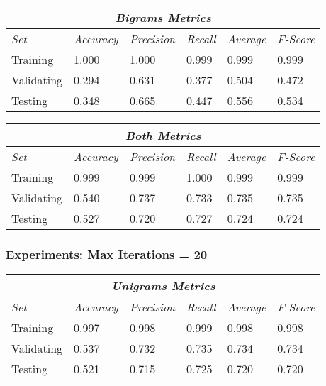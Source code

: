 \documentclass[11pt]{article}
\begin{document}
\hfill \break

\begin{tabular}{ |p{2cm}||p{2cm}|p{2cm}|p{2cm}|p{2cm}|p{2cm}|  }
 \hline
 \multicolumn{6}{|c|}{\textbf{\textit{Bigrams Metrics}}} \\
 \hline
 \textit{Set} & \textit{Accuracy} & \textit{Precision} & \textit{Recall} & \textit{Average} & \textit{F-Score} \\
 \hline
 Training   & 1.000 & 1.000 & 0.999 & 0.999 & 0.999 \\
 Validating & 0.294 & 0.631 & 0.377 & 0.504 & 0.472 \\
 Testing    & 0.348 & 0.665 & 0.447 & 0.556 & 0.534 \\
 \hline
\end{tabular}

\hfill \break

\begin{tabular}{ |p{2cm}||p{2cm}|p{2cm}|p{2cm}|p{2cm}|p{2cm}|  }
 \hline
 \multicolumn{6}{|c|}{\textbf{\textit{Both Metrics}}} \\
 \hline
 \textit{Set} & \textit{Accuracy} & \textit{Precision} & \textit{Recall} & \textit{Average} & \textit{F-Score} \\
 \hline
 Training   & 0.999 & 0.999 & 1.000 & 0.999 & 0.999 \\
 Validating & 0.540 & 0.737 & 0.733 & 0.735 & 0.735 \\
 Testing    & 0.527 & 0.720 & 0.727 & 0.724 & 0.724 \\
 \hline
\end{tabular}


\subsubsection{Experiments: Max Iterations = 20}

\begin{tabular}{ |p{2cm}||p{2cm}|p{2cm}|p{2cm}|p{2cm}|p{2cm}|  }
 \hline
 \multicolumn{6}{|c|}{\textbf{\textit{Unigrams Metrics}}} \\
 \hline
 \textit{Set} & \textit{Accuracy} & \textit{Precision} & \textit{Recall} & \textit{Average} & \textit{F-Score} \\
 \hline
 Training   & 0.997 & 0.998 & 0.999 & 0.998 & 0.998 \\
 Validating & 0.537 & 0.732 & 0.735 & 0.734 & 0.734 \\
 Testing    & 0.521 & 0.715 & 0.725 & 0.720 & 0.720 \\
 \hline
\end{tabular}
\end{document}
